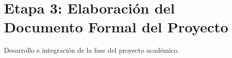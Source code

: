 \section{Etapa 3: Elaboración del Documento Formal del Proyecto}
Desarrollo e integración de la fase del proyecto académico.
